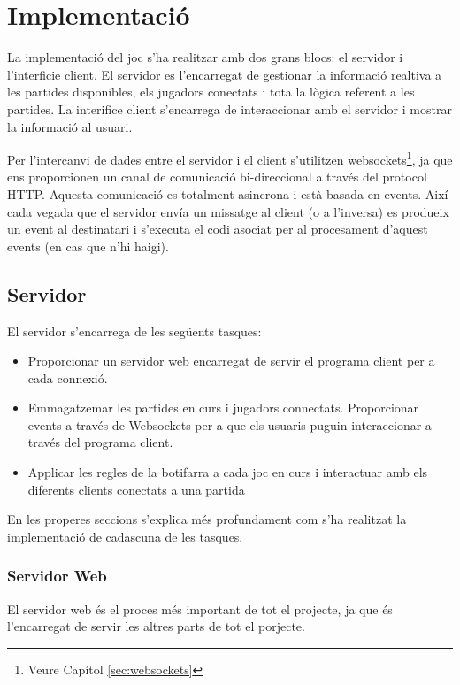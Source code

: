 \chapter{Implementació}

La implementació del joc s'ha realitzar amb dos grans blocs: el servidor i l'interficie client. El servidor es l'encarregat de gestionar la informació realtiva a les partides disponibles, els jugadors conectats i tota la lògica referent a les partides. La interifice client s'encarrega de interaccionar amb el servidor i mostrar la informació al usuari. 

Per l'intercanvi de dades entre el servidor i el client s'utilitzen websockets\footnote{Veure Capítol \ref{sec:websockets}}, ja que ens proporcionen un canal de comunicació bi-direccional a través del protocol HTTP. Aquesta comunicació es totalment asincrona i està basada en events. Així cada vegada que el servidor envía un missatge al client (o a l'inversa) es produeix un event al destinatari i s'executa el codi asociat per al procesament d'aquest events (en cas que n'hi haigi). 

\section{Servidor}

El servidor s'encarrega de les següents tasques: 

\begin{itemize}
\item{Proporcionar un servidor web encarregat de servir el programa client per a cada connexió.}
\item{Emmagatzemar les partides en curs i jugadors connectats. Proporcionar events a través de Websockets per a que els usuaris puguin interaccionar a través del programa client. }
\item{Applicar les regles de la botifarra a cada joc en curs i interactuar amb els diferents clients conectats a una partida}
\end{itemize}

En les properes seccions s'explica més profundament com s'ha realitzat la implementació de cadascuna de les tasques. 

\subsection{Servidor Web}

El servidor web és el proces més important de tot el projecte, ja que és l'encarregat de servir les altres parts de tot el porjecte. 

